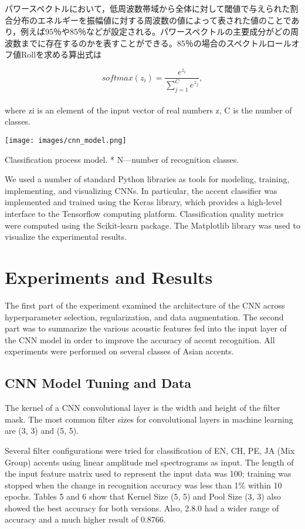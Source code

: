 パワースペクトルにおいて，低周波数帯域から全体に対して閾値で与えられた割合分布のエネルギーを振幅値に対する周波数の値によって表された値のことであり，例えば95％や85％などが設定される。パワースペクトルの主要成分がどの周波数までに存在するのかを表すことができる。85％の場合のスペクトルロールオフ値Rollを求める算出式は\documentclass[ams]{U-AizuGT}
\begin{document}
\begin{equation}
softmax(z_i)=\frac{e^{z_i}}{\sum\nolimits_{j=1}^{C} e^{z_j}},
\end{equation}
\\
where zi is an element of the input vector of real numbers z, C is the number of classes.

\begin{table}[h]
    \centering
    \texttt{[image: images/cnn\_model.png]}
    \caption{Classification process model. * N—number of recognition classes.}
\end{table}

We used a number of standard Python libraries as tools for modeling, training, implementing, and visualizing CNNs. In particular, the accent classifier was implemented and trained using the Keras library, which provides a high-level interface to the Tensorflow computing platform. Classification quality metrics were computed using the Scikit-learn package. The Matplotlib library was used to visualize the experimental results.

\section{Experiments and Results}
The first part of the experiment examined the architecture of the CNN across hyperparameter selection, regularization, and data augmentation. The second part was to summarize the various acoustic features fed into the input layer of the CNN model in order to improve the accuracy of accent recognition. All experiments were performed on several classes of Asian accents.
\subsection{CNN Model Tuning and Data }
The kernel of a CNN convolutional layer is the width and height of the filter mask. The most common filter sizes for convolutional layers in machine learning are (3, 3) and (5, 5).\par
Several filter configurations were tried for classification of {EN, CH, PE, JA} (Mix Group) accents using linear amplitude mel spectrograms as input. The length of the input feature matrix used to represent the input data was 100; training was stopped when the change in recognition accuracy was less than 1\% within 10 epochs. Tables 5 and 6 show that Kernel Size (5, 5) and Pool Size (3, 3) also showed the best accuracy for both versions. Also, 2.8.0 had a wider range of accuracy and a much higher result of 0.8766.
\end{document}
